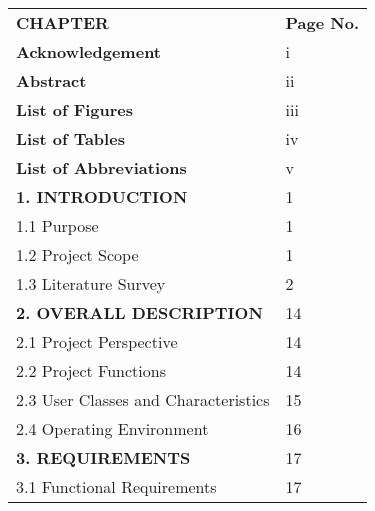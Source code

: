 \begin{tabular}{ll}
    \large \textbf{CHAPTER} & \textbf{Page No.} \\
    \textbf{Acknowledgement} & \hspace{0.8cm}i \\
    \textbf{Abstract} & \hspace{0.8cm}ii \\
    \textbf{List of Figures} & \hspace{0.8cm}iii \\
    \textbf{List of Tables} & \hspace{0.8cm}iv \\
    \textbf{List of Abbreviations} & \hspace{0.8cm}v \\[0.5cm]
    \textbf{1. INTRODUCTION} & \hspace{0.8cm}1 \\
    \hspace{0.5cm} 1.1 Purpose & \hspace{0.8cm}1 \\
    \hspace{0.5cm} 1.2 Project Scope & \hspace{0.8cm}1 \\
    \hspace{0.5cm} 1.3 Literature Survey & \hspace{0.8cm}2 \\[0.5cm]
    \textbf{2. OVERALL DESCRIPTION} & \hspace{0.8cm}14 \\
    \hspace{0.5cm} 2.1 Project Perspective & \hspace{0.8cm}14 \\
    \hspace{0.5cm} 2.2 Project Functions & \hspace{0.8cm}14 \\
    \hspace{0.5cm} 2.3 User Classes and Characteristics & \hspace{0.8cm}15 \\
    \hspace{0.5cm} 2.4 Operating Environment & \hspace{0.8cm}16 \\[0.5cm]
    \textbf{3. REQUIREMENTS} & \hspace{0.8cm}17 \\
    \hspace{0.5cm} 3.1 Functional Requirements & \hspace{0.8cm}17 \\

\end{tabular}
